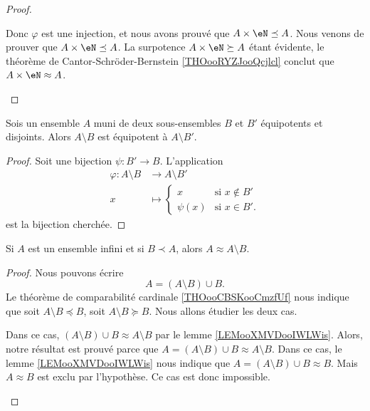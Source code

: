\begin{proof}
\begin{subproof}
		Donc \( \varphi\) est une injection, et nous avons prouvé que \( A\times \eN\preceq A\).
		\spitem[La bijection]
		Nous venons de prouver que \( A\times \eN\preceq A\). La surpotence \( A\times \eN\succeq A\) étant évidente, le théorème de Cantor-Schröder-Bernstein \ref{THOooRYZJooQcjlcl} conclut que \( A\times \eN\approx A\).
	\end{subproof}
\end{proof}

\begin{lemma}        \label{LEMooDHWSooFqhano}
	Sois un ensemble \( A\) muni de deux sous-ensembles \( B\) et \( B'\) équipotents et disjoints. Alors \( A\setminus B\) est équipotent à \( A\setminus B'\).
\end{lemma}

\begin{proof}
	Soit une bijection \( \psi\colon B'\to B\). L'application
	\begin{equation}
		\begin{aligned}
			\varphi\colon A\setminus B & \to A\setminus B'                       \\
			x                          & \mapsto \begin{cases}
				                                     x       & \text{si } x\notin B' \\
				                                     \psi(x) & \text{si } x\in B'.
			                                     \end{cases}
		\end{aligned}
	\end{equation}
	est la bijection cherchée.
\end{proof}

\begin{lemma}       \label{LEMooIVCBooHWQiZB}
	Si \( A\) est un ensemble infini et si \( B\prec A\), alors \( A\approx A\setminus B\).
\end{lemma}

\begin{proof}
	Nous pouvons écrire
	\begin{equation}
		A=(A\setminus B)\cup B.
	\end{equation}
	Le théorème de comparabilité cardinale \ref{THOooCBSKooCmzfUf} nous indique que soit \( A\setminus B\preceq B\), soit \( A\setminus B\succeq B\). Nous allons étudier les deux cas.
	\begin{subproof}
		Dans ce cas, \( (A\setminus B)\cup B\approx A\setminus B\) par le lemme \ref{LEMooXMVDooIWLWis}. Alors, notre résultat est prouvé parce que \( A=(A\setminus B)\cup B\approx A\setminus B\).
		Dans ce cas, le lemme \ref{LEMooXMVDooIWLWis} nous indique que \( A=(A\setminus B)\cup B\approx B\). Mais \( A\approx B\) est exclu par l'hypothèse. Ce cas est donc impossible.
	\end{subproof}
\end{proof}

